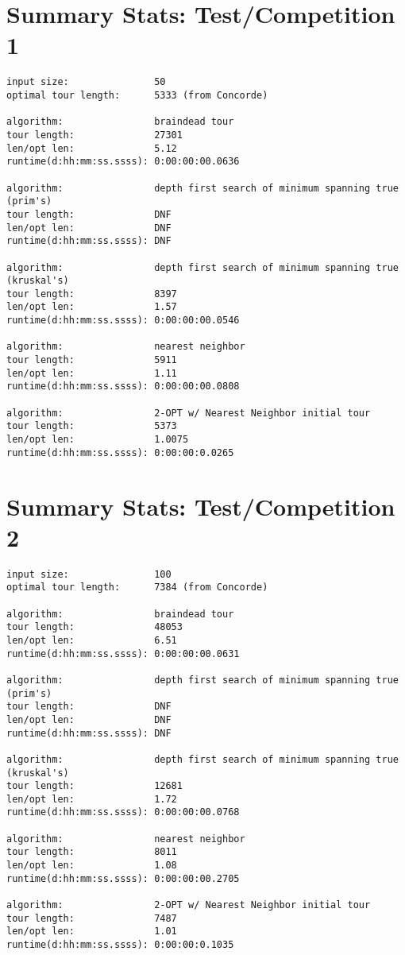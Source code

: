 \documentclass[12pt]{article}
\begin{document}
\newpage
\section*{Summary Stats: Test/Competition 1}
\begin{verbatim}
input size:               50
optimal tour length:      5333 (from Concorde)

algorithm:                braindead tour
tour length:              27301
len/opt len:              5.12
runtime(d:hh:mm:ss.ssss): 0:00:00:00.0636

algorithm:                depth first search of minimum spanning true (prim's) 
tour length:              DNF
len/opt len:              DNF
runtime(d:hh:mm:ss.ssss): DNF

algorithm:                depth first search of minimum spanning true (kruskal's) 
tour length:              8397
len/opt len:              1.57
runtime(d:hh:mm:ss.ssss): 0:00:00:00.0546

algorithm:                nearest neighbor 
tour length:              5911
len/opt len:              1.11
runtime(d:hh:mm:ss.ssss): 0:00:00:00.0808

algorithm:                2-OPT w/ Nearest Neighbor initial tour
tour length:              5373
len/opt len:              1.0075
runtime(d:hh:mm:ss.ssss): 0:00:00:0.0265
\end{verbatim}

\newpage
\section*{Summary Stats: Test/Competition 2}
\begin{verbatim}
input size:               100
optimal tour length:      7384 (from Concorde)

algorithm:                braindead tour
tour length:              48053
len/opt len:              6.51
runtime(d:hh:mm:ss.ssss): 0:00:00:00.0631

algorithm:                depth first search of minimum spanning true (prim's) 
tour length:              DNF
len/opt len:              DNF
runtime(d:hh:mm:ss.ssss): DNF

algorithm:                depth first search of minimum spanning true (kruskal's) 
tour length:              12681
len/opt len:              1.72
runtime(d:hh:mm:ss.ssss): 0:00:00:00.0768

algorithm:                nearest neighbor 
tour length:              8011
len/opt len:              1.08
runtime(d:hh:mm:ss.ssss): 0:00:00:00.2705

algorithm:                2-OPT w/ Nearest Neighbor initial tour
tour length:              7487
len/opt len:              1.01
runtime(d:hh:mm:ss.ssss): 0:00:00:0.1035
\end{verbatim}
\end{document}
